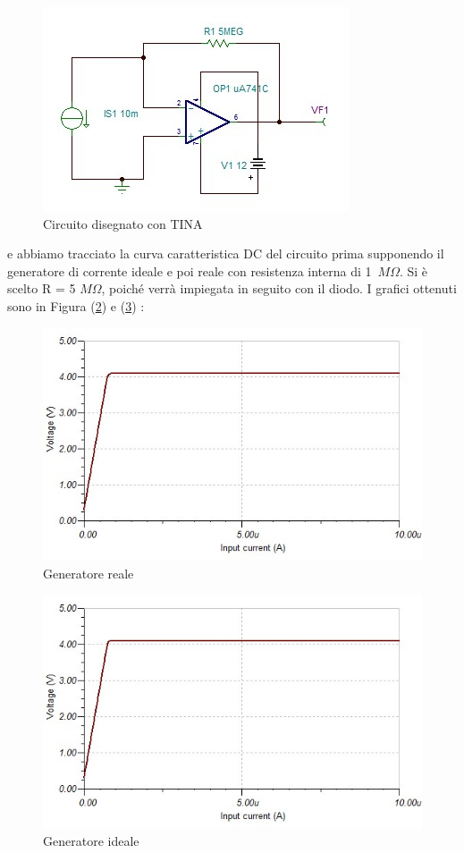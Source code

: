 \documentclass[journal, a4paper]{IEEEtran}
\begin{document}
\begin{figure}[htp]
\caption{Circuito disegnato con TINA}
\label{fig_tina}
\centering
\includegraphics[scale=.4]{CONVERTITORE}
\end{figure}

e abbiamo tracciato la curva caratteristica DC del circuito prima supponendo il generatore di corrente ideale e poi reale con resistenza interna di 1~$M\Omega$. Si è scelto R = 5 $M\Omega$, poiché verrà impiegata in seguito con il diodo.
I grafici ottenuti sono in Figura (\ref{gen_rel}) e (\ref{gen_id}) :\\

\begin{figure}[htp]
\centering
\includegraphics[scale=.35]{convertitore_analysis}
\caption{Generatore reale}
\label{gen_rel}
\end{figure}

\begin{figure}[htp]
\centering
\includegraphics[scale=.35]{convertitore_analysis_infinite}
\caption{Generatore ideale\\}
\label{gen_id}
\end{figure}
\end{document}
